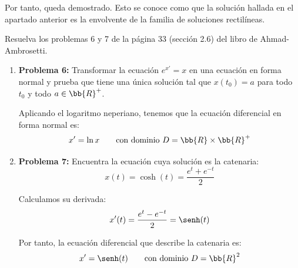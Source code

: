 \begin{ejercicio}
\begin{enumerate}
        Por tanto, queda demostrado. Esto se conoce como que la solución hallada en el apartado anterior es la envolvente de la familia de soluciones rectilíneas.
    \end{enumerate}
\end{ejercicio}

\begin{ejercicio}
    Resuelva los problemas 6 y 7 de la página 33 (sección 2.6) del libro de Ahmad-Ambrosetti.

    \begin{enumerate}
        \item \textbf{Problema 6:} Transformar la ecuación $e^{x'}=x$ en una ecuación en forma normal y prueba que tiene una única solución tal que $x(t_0)=a$ para todo $t_0$ y todo $a\in \bb{R}^+$.
        
        Aplicando el logaritmo neperiano, tenemos que la ecuación diferencial en forma normal es:
        \begin{equation*}
            x' = \ln x\qquad \text{con dominio } D=\bb{R}\times \bb{R}^+
        \end{equation*}

        
        \item \textbf{Problema 7:} Encuentra la ecuación cuya solución es la catenaria:
        \begin{equation*}
            x(t) = \cosh\left(t\right) = \dfrac{e^t + e^{-t}}{2}
        \end{equation*}

        Calculamos su derivada:
        \begin{equation*}
            x'(t) = \dfrac{e^t - e^{-t}}{2} = \senh(t)
        \end{equation*}

        Por tanto, la ecuación diferencial que describe la catenaria es:
        \begin{equation*}
            x' = \senh(t) \qquad \text{con dominio } D=\bb{R}^2
        \end{equation*}
    \end{enumerate}
\end{ejercicio}

